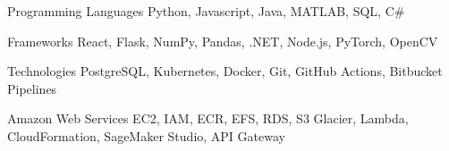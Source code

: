 
\begin{cvskills}
  \cvskill 
    {Programming Languages}
    {Python, Javascript, Java, MATLAB, SQL, C\#}

  \cvskill
    {Frameworks}
    {React, Flask, NumPy, Pandas, .NET, Node.js, PyTorch, OpenCV}

    \cvskill 
    {Technologies}
    {PostgreSQL, Kubernetes, Docker, Git, GitHub Actions, Bitbucket Pipelines}


    \cvskill 
    {Amazon Web Services}
    {EC2, IAM, ECR, EFS, RDS, S3 Glacier, Lambda, CloudFormation, SageMaker Studio, API Gateway}


\end{cvskills}
